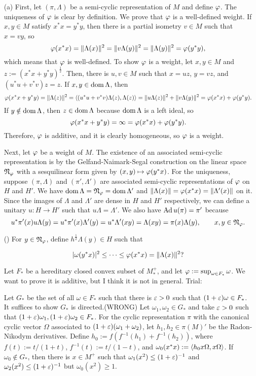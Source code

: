 \documentclass{../../large}
\begin{document}
\begin{pf}
(a)
First, let $(\pi,\Lambda)$ be a semi-cyclic representation of $M$ and define $\varphi$.
The uniqueness of $\varphi$ is clear by definition.
We prove that $\varphi$ is a well-defined weight.
If $x,y\in M$ satisfy $x^*x=y^*y$, then there is a partial isometry $v\in M$ such that $x=vy$, so
\[\varphi(x^*x)=\|\Lambda(x)\|^2=\|v\Lambda(y)\|^2=\|\Lambda(y)\|^2=\varphi(y^*y),\]
which means that $\varphi$ is well-defined.
To show $\varphi$ is a weight, let $x,y\in M$ and $z:=(x^*x+y^*y)^{\frac12}$.
Then, there is $u,v\in M$ such that $x=uz$, $y=vz$, and $(u^*u+v^*v)z=z$.
If $x,y\in\operatorname{dom}\Lambda$, then
\[\varphi(x^*x+y^*y)=\|\Lambda(z)\|^2=\langle(u^*u+v^*v)\Lambda(z),\Lambda(z)\rangle=\|u\Lambda(z)\|^2+\|v\Lambda(y)\|^2=\varphi(x^*x)+\varphi(y^*y).\]
If $y\notin\operatorname{dom}\Lambda$, then $z\in\operatorname{dom}\Lambda$ because $\operatorname{dom}\Lambda$ is a left ideal, so
\[\varphi(x^*x+y^*y)=\infty=\varphi(x^*x)+\varphi(y^*y).\]
Therefore, $\varphi$ is additive, and it is clearly homogeneous, so $\varphi$ is a weight.

Next, let $\varphi$ be a weight of $M$.
The existence of an associated semi-cyclic representation is by the Gelfand-Naimark-Segal construction on the linear space $\mathfrak{N}_\varphi$ with a sesquilinear form given by $(x,y)\mapsto\varphi(y^*x)$.
For the uniqueness, suppose $(\pi,\Lambda)$ and $(\pi',\Lambda')$ are associated semi-cyclic representations of $\varphi$ on $H$ and $H'$.
We have $\operatorname{dom}\Lambda=\mathfrak{N}_\varphi=\operatorname{dom}\Lambda'$ and $\|\Lambda(x)\|=\varphi(x^*x)=\|\Lambda'(x)\|$ on it.
Since the images of $\Lambda$ and $\Lambda'$ are dense in $H$ and $H'$ respectively, we can define a unitary $u:H\to H'$ such that $u\Lambda=\Lambda'$.
We also have $\operatorname{Ad} u(\pi)=\pi'$ because
\[u^*\pi'(x)u\Lambda(y)=u^*\pi'(x)\Lambda'(y)=u^*\Lambda'(xy)=\Lambda(xy)=\pi(x)\Lambda(y),\qquad x,y\in\mathfrak{N}_\varphi.\]



\iffalse
()
For $y\in\mathfrak{N}_\varphi$, define $h^{\frac12}\Lambda(y)\in H$ such that

\[|\omega(y^*x)|^2\le\cdots\le\varphi(x^*x)=\|\Lambda(x)\|^2?\]

Let $F_*$ be a hereditary closed convex subset of $M_*^+$, and let $\varphi:=\sup_{\omega\in F_*}\omega$.
We want to prove it is additive, but I think it is not in general.
Trial:

Let $G_*$ be the set of all $\omega\in F_*$ such that there is $\varepsilon>0$ such that $(1+\varepsilon)\omega\in F_*$.
It suffices to show $G_*$ is directed.(WRONG)
Let $\omega_1,\omega_2\in G_*$ and take $\varepsilon>0$ such that $(1+\varepsilon)\omega_1,(1+\varepsilon)\omega_2\in F_*$.
For the cyclic representation $\pi$ with the canonical cyclic vector $\Omega$ associated to $(1+\varepsilon)(\omega_1+\omega_2)$, let $h_1,h_2\in\pi(M)'$ be the Radon-Nikodym derivatives.
Define $h_0:=f(f^{-1}(h_1)+f^{-1}(h_2))$, where $f(t):=t/(1+t)$, $f^{-1}(t):=t/(1-t)$, and $\omega_0(x^*x):=\langle h_0x\Omega,x\Omega\rangle$.
If $\omega_0\notin G_*$, then there is $x\in M^+$ such that $\omega_1(x^2)\le(1+\varepsilon)^{-1}$ and $\omega_2(x^2)\le(1+\varepsilon)^{-1}$ but $\omega_0(x^2)\ge1$.


\end{pf}
\end{document}
